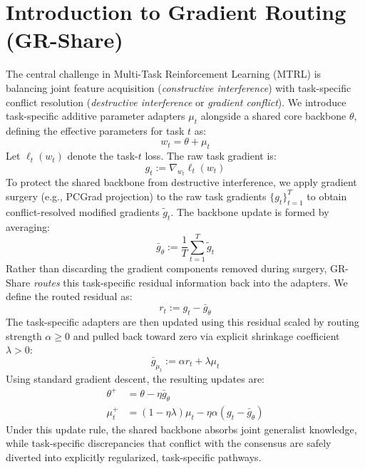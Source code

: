 \documentclass[11pt,a4paper]{article}
\begin{document}
\section{Introduction to Gradient Routing (GR-Share)}
The central challenge in Multi-Task Reinforcement Learning (MTRL) is balancing joint feature acquisition (\textit{constructive interference}) with task-specific conflict resolution (\textit{destructive interference} or \textit{gradient conflict}). 
We introduce task-specific additive parameter adapters $\mu_t$ alongside a shared core backbone $\theta$, defining the effective parameters for task $t$ as:
\begin{equation}
    w_t = \theta + \mu_t
\end{equation}
Let $\ell_t(w_t)$ denote the task-$t$ loss. The raw task gradient is:
\begin{equation}
    g_t := \nabla_{w_t} \ell_t(w_t)
\end{equation}
To protect the shared backbone from destructive interference, we apply gradient surgery (e.g., PCGrad projection) to the raw task gradients $\{g_t\}_{t=1}^T$ to obtain conflict-resolved modified gradients $\tilde{g}_t$. The backbone update is formed by averaging:
\begin{equation}
    \bar{g}_{\theta} := \frac{1}{T}\sum_{t=1}^T \tilde{g}_t
\end{equation}
Rather than discarding the gradient components removed during surgery, GR-Share \textit{routes} this task-specific residual information back into the adapters. We define the routed residual as:
\begin{equation}
    r_t := g_t - \bar{g}_{\theta}
\end{equation}
The task-specific adapters are then updated using this residual scaled by routing strength $\alpha \ge 0$ and pulled back toward zero via explicit shrinkage coefficient $\lambda > 0$:
\begin{equation}
    \bar{g}_{\mu_t} := \alpha r_t + \lambda \mu_t
\end{equation}
Using standard gradient descent, the resulting updates are:
\begin{align}
    \theta^{+} &= \theta - \eta \bar{g}_{\theta} \\
    \mu_t^{+}  &= (1 - \eta\lambda)\mu_t - \eta\alpha(g_t - \bar{g}_{\theta})
\end{align}
Under this update rule, the shared backbone absorbs joint generalist knowledge, while task-specific discrepancies that conflict with the consensus are safely diverted into explicitly regularized, task-specific pathways.
\end{document}
